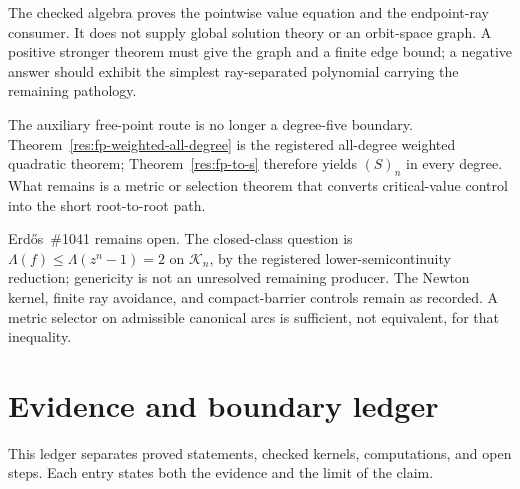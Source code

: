 The checked algebra proves the pointwise value equation and the endpoint-ray
consumer.  It does not supply global solution theory or an orbit-space graph.
A positive stronger theorem must give the graph and a finite edge bound; a
negative answer should exhibit the simplest ray-separated polynomial carrying
the remaining pathology.

The auxiliary free-point route is no longer a degree-five boundary.
Theorem~\ref{res:fp-weighted-all-degree} is the registered all-degree
weighted quadratic theorem; Theorem~\ref{res:fp-to-s} therefore yields
$(S)_n$ in every degree.  What remains is a metric or selection theorem
that converts critical-value control into the short root-to-root path.

Erd\H{o}s~\#1041 remains open.  The closed-class question is
$\Lambda(f)\le\Lambda(z^n-1)=2$ on $\mathcal K_n$, by the registered
lower-semicontinuity reduction; genericity is not an unresolved remaining
producer.  The Newton kernel, finite ray avoidance, and compact-barrier
controls remain as recorded.  A metric selector on admissible canonical arcs
is sufficient, not equivalent, for that inequality.



\section{Evidence and boundary ledger}
\label{sec:evidence-ledger}

This ledger separates proved statements, checked kernels, computations, and
open steps.  Each entry states both the evidence and the limit of the claim.

